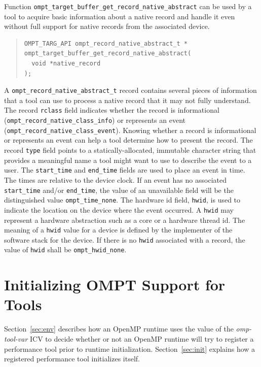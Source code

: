 \documentclass{article}
\begin{document}
Function  \verb|ompt_target_buffer_get_record_native_abstract| can be used by a tool to acquire basic information about a native record and handle it even without full support for  native records from the associated device.
\begin{quote}
\begin{verbatim}
OMPT_TARG_API ompt_record_native_abstract_t *
ompt_target_buffer_get_record_native_abstract(
  void *native_record 
);

\end{verbatim}
\end{quote}
A  \verb|ompt_record_native_abstract_t| record contains several pieces of information that a tool can use to process a native record that it may not fully understand. The record \verb|rclass| field indicates whether the record is informational (\verb|ompt_record_native_class_info|) or represents an event (\verb|ompt_record_native_class_event|). Knowing whether a record is informational or represents an event can help a tool determine how to present the record. The record  \verb|type| field points to a statically-allocated, immutable character string that provides  a meaningful name  a tool might want to use to describe the event to a user. The \verb|start_time| and \verb|end_time| fields are used to place an event in time. The times are relative to the device clock. If an event has no associated \verb|start_time| and/or \verb|end_time|, the value of an unavailable field will be the distinguished value \verb|ompt_time_none|. The hardware id field, \verb|hwid|,  is used to indicate the location on the device where the event occurred. A \verb|hwid| may represent a hardware abstraction such as a core or a hardware thread id. The meaning of a \verb|hwid| value for a device is defined by the implementer of the software stack for the device. If there is no \verb|hwid| associated with a record, the value of \verb|hwid| shall be \verb|ompt_hwid_none|. 

\section{Initializing OMPT Support for Tools}
\label{sec:enabling}

Section~\ref{sec:env} describes how an OpenMP runtime uses the value of the {\em omp-tool-var} ICV to decide whether or not an OpenMP runtime will try to register a performance tool prior to runtime initialization.
Section~\ref{sec:init} explains how a registered performance tool initializes itself.
\end{document}
